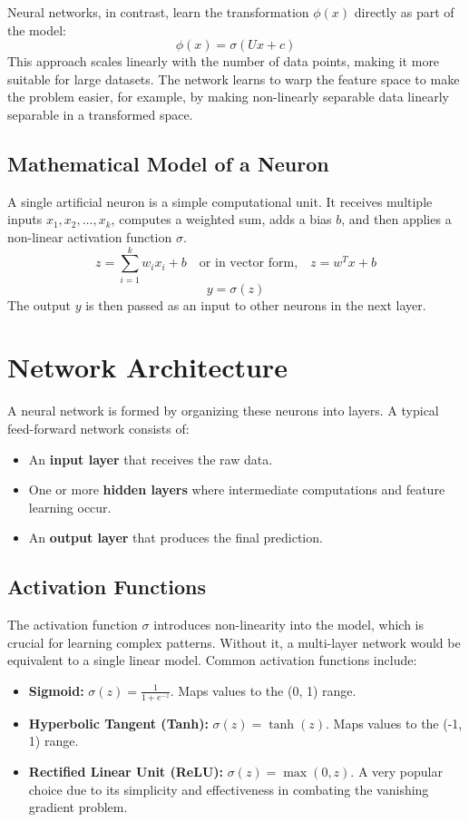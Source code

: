 \documentclass{article}
\begin{document}
\begin{multicols}{2}
	Neural networks, in contrast, learn the transformation $\phi(x)$ directly as part of the model:
	$$ \phi(x) = \sigma(Ux + c) $$
	This approach scales linearly with the number of data points, making it more suitable for large datasets. The network learns to warp the feature space to make the problem easier, for example, by making non-linearly separable data linearly separable in a transformed space.

	\subsection{Mathematical Model of a Neuron}
	A single artificial neuron is a simple computational unit. It receives multiple inputs $x_1, x_2, \dots, x_k$, computes a weighted sum, adds a bias $b$, and then applies a non-linear activation function $\sigma$.
	$$ z = \sum_{i=1}^{k} w_i x_i + b \quad \text{or in vector form,} \quad z = w^T x + b $$
	$$ y = \sigma(z) $$
	The output $y$ is then passed as an input to other neurons in the next layer.

	\section{Network Architecture}
	A neural network is formed by organizing these neurons into layers. A typical feed-forward network consists of:
	\begin{itemize}
		\item An \textbf{input layer} that receives the raw data.
		\item One or more \textbf{hidden layers} where intermediate computations and feature learning occur.
		\item An \textbf{output layer} that produces the final prediction.
	\end{itemize}

	\subsection{Activation Functions}
	The activation function $\sigma$ introduces non-linearity into the model, which is crucial for learning complex patterns. Without it, a multi-layer network would be equivalent to a single linear model. Common activation functions include:
	\begin{itemize}
		\item \textbf{Sigmoid:} $\sigma(z) = \frac{1}{1 + e^{-z}}$. Maps values to the (0, 1) range.
		\item \textbf{Hyperbolic Tangent (Tanh):} $\sigma(z) = \tanh(z)$. Maps values to the (-1, 1) range.
		\item \textbf{Rectified Linear Unit (ReLU):} $\sigma(z) = \max(0, z)$. A very popular choice due to its simplicity and effectiveness in combating the vanishing gradient problem.
	\end{itemize}


\end{multicols}
\end{document}
